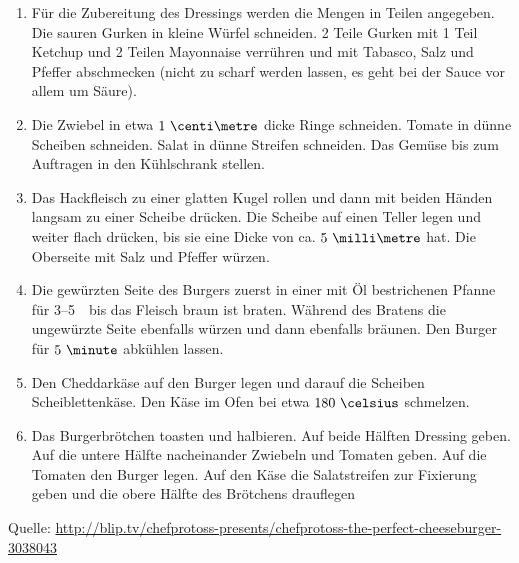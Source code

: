 \begin{enumerate}
\item	Für die Zubereitung des Dressings werden die Mengen in Teilen angegeben.
	Die sauren Gurken in kleine Würfel schneiden.
	2 Teile Gurken mit 1 Teil Ketchup und 2 Teilen Mayonnaise verrühren und mit Tabasco, Salz und Pfeffer abschmecken (nicht zu scharf werden lassen, es geht bei der Sauce vor allem um Säure).
\item	Die Zwiebel in etwa $1~\centi\metre$ dicke Ringe schneiden.
	Tomate in dünne Scheiben schneiden.
	Salat in dünne Streifen schneiden.
	Das Gemüse bis zum Auftragen in den Kühlschrank stellen.
\item	Das Hackfleisch zu einer glatten Kugel rollen und dann mit beiden Händen langsam zu einer Scheibe drücken.
	Die Scheibe auf einen Teller legen und weiter flach drücken, bis sie eine Dicke von ca. $5~\milli\metre$ hat.
	Die Oberseite mit Salz und Pfeffer würzen.
\item	Die gewürzten Seite des Burgers zuerst in einer mit Öl bestrichenen Pfanne für 3--5~\minute\ bis das Fleisch braun ist braten.
	Während des Bratens die ungewürzte Seite ebenfalls würzen und dann ebenfalls bräunen.
	Den Burger für $5~\minute$ abkühlen lassen.
\item	Den Cheddarkäse auf den Burger legen und darauf die Scheiben Scheiblettenkäse.
	Den Käse im Ofen bei etwa $180~\celsius$ schmelzen.
\item	Das Burgerbrötchen toasten und halbieren.
	Auf beide Hälften Dressing geben.
	Auf die untere Hälfte nacheinander Zwiebeln und Tomaten geben.
	Auf die Tomaten den Burger legen.
	Auf den Käse die Salatstreifen zur Fixierung geben und die obere Hälfte des Brötchens drauflegen
\end{enumerate}

Quelle: \url{http://blip.tv/chefprotoss-presents/chefprotoss-the-perfect-cheeseburger-3038043}